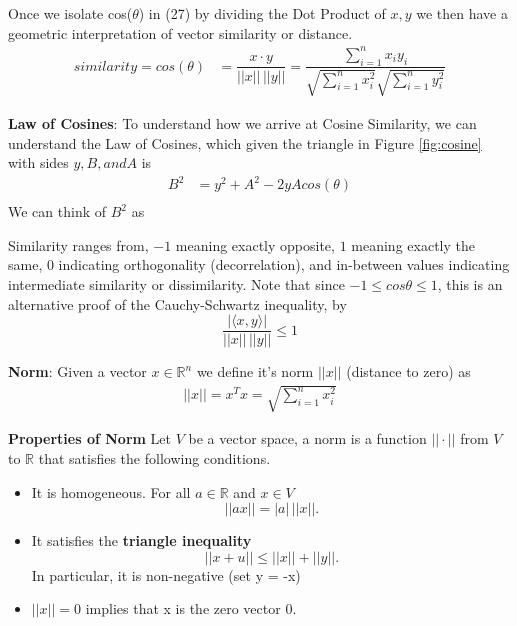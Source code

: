 \documentclass[12pt]{article}
\newenvironment{definition}[2][Definition]{\begin{trivlist}
\item[\hskip \labelsep {\bfseries #1}\hskip \labelsep {\bfseries #2}]}{\end{trivlist}}
\newenvironment{lemma}[2][Lemma]{\begin{trivlist}
\item[\hskip \labelsep {\bfseries #1}\hskip \labelsep {\bfseries #2}]}{\end{trivlist}}
\newenvironment{corollary}[2][Corollary]{\begin{trivlist}
\item[\hskip \labelsep {\bfseries #1}\hskip \labelsep {\bfseries #2}]}{\end{trivlist}}
\begin{document}
\begin{definition}{2.10}
\begin{corollary}{2.10.3}
\noindent
Once we isolate cos(\(\theta\)) in (27) by dividing the Dot Product of \(x,y\) we then have a geometric interpretation of vector similarity or distance.
\begin{equation}
\begin{split}
    similarity = cos(\theta) &= \dfrac{x \cdot y}{||x||\,||y||} = \dfrac{\sum^n_{i=1} x_i y_i}{\sqrt{\sum^n_{i=1} x_i^2} \sqrt{\sum^n_{i=1} y_i^2}}
\end{split}
\end{equation}
\noindent
\begin{lemma}{2.10.3.1}\textbf{Law of Cosines}: To understand how we arrive at Cosine Similarity, we can understand the Law of Cosines, which given the triangle in Figure \ref{fig:cosine} with sides $y, B, and A$ is
\begin{equation}
\begin{split}
B^2 &= y^2 + A^2 - 2yA cos(\theta) \\
\end{split}
\end{equation}
\noindent
We can think of $B^2$ as 
\end{lemma}
Similarity ranges from, $-1$ meaning exactly opposite, $1$ meaning exactly the same, $0$ indicating orthogonality (decorrelation), and in-between values indicating intermediate similarity or dissimilarity.
\noindent
Note that since \(-1 \leq cos\theta \leq 1\), this is an alternative proof of the Cauchy-Schwartz inequality, by
\[\dfrac{|\langle x,y \rangle|}{||x|| \, ||y||} \leq 1\]
\end{corollary}
\end{definition}


\begin{definition}{2.11} \textbf{Norm}: Given a vector \(x \in \mathbb{R}^n\) we define it's norm $||x||$ (distance to zero) as
\begin{equation}
\begin{split}
    ||x|| = x^T x = \sqrt{\sum^n_{i=1} x^2_i}
\end{split}
\end{equation}
\noindent
\begin{corollary}{2.11.1} \textbf{Properties of Norm} Let $V$ be a vector space, a norm is a function \(||\cdot||\) from $V$ to \(\mathbb{R}\) that satisfies the following conditions.
\begin{itemize}
    \item It is homogeneous. For all \(a \in \mathbb{R}\) and \(x \in V\) \[||ax|| = |a| \, ||x||.\]
    \item It satisfies the \textbf{triangle inequality} \[||x + u|| \leq ||x|| + ||y||.\]
    \noindent In particular, it is non-negative (set y = -x)
    \item \(||x|| = 0\) implies that x is the zero vector 0.
\end{itemize}
\end{corollary}
\end{definition}
\end{document}
